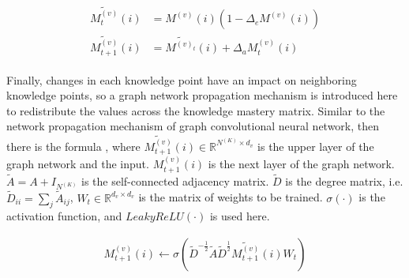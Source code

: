\begin{align}\label{fml:ch3-modify}
    \begin{split}
        \tilde{M^{(v)}_t}(i) &= M^{(v)}(i)(1-\Delta_e{M^{(v)}(i)}) \\
        \tilde{M^{(v)}_{t+1}}(i) &= \tilde{M^{(v)_t}}(i) + \Delta_a{M^{(v)}_t(i)}
    \end{split}
\end{align}


Finally, changes in each knowledge point have an impact on neighboring knowledge points, so a graph network propagation mechanism is introduced here to redistribute the values across the knowledge mastery matrix. Similar to the network propagation mechanism of graph convolutional neural network, then there is the formula \eqname{\ref{fml:ch3-graphpropagate}}, where \(\tilde{M^{(v)}_{t+1}}(i)\in\mathbb{R}^{N^{(K)}\times d_v}\) is the upper layer of the graph network and the input. \(M^{(v)}_{t+1}(i)\) is the next layer of the graph network. \(\tilde{A}=A+I_{N^{(K)}}\) is the self-connected adjacency matrix. \(\tilde{D}\) is the degree matrix, i.e. \(\tilde{D}_{ii}=\sum_j{\tilde{A}_{ij}}\), \(W_t\in\mathbb{R}^{d_v \times d_v}\) is the matrix of weights to be trained. \(\sigma(\cdot)\) is the activation function, and \(LeakyReLU(\cdot)\) is used here.

\begin{align}\label{fml:ch3-graphpropagate}
    M^{(v)}_{t+1}(i) \leftarrow \sigma(\tilde{D}^{-\frac{1}{2}}\tilde{A}\tilde{D}^{\frac{1}{2}}\tilde{M^{(v)}_{t+1}}(i)W_t)
\end{align}



